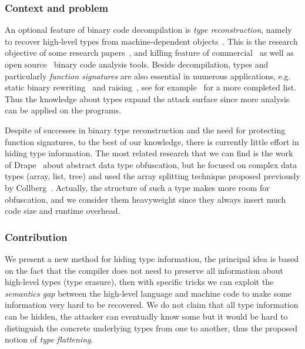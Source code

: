 \documentclass[compsoc,conference,a4paper,10pt,times]{IEEEtran}
\begin{document}
\subsubsection*{Context and problem}
An optional feature of binary code decompilation is \emph{type reconstruction}, namely to recover high-level types from machine-dependent
objects~\cite{mycroft_type-based_1999, van_emmerik_static_2007}. This is the research objective of some
research papers~\cite{lee_tie_2011,elwazeer_scalable_2013,robbins_minx_2016,noonan_polymorphic_2016},
and killing feature of commercial~\cite{noauthor_hex-rays_nodate,noauthor_jeb_nodate}
as well as open source~\cite{noauthor_ghidra_nodate} binary code analysis tools. Beside decompilation,
types and particularly \emph{function signatures} are also essential in numerous applications,
e.g. static binary rewriting~\cite{bernat_anywhere_2011,anand_compiler-level_2013} and
raising~\cite{yadavalli_raising_2019,goodman_lifting_2018},
see for example~\cite{caballero_type_2016} for a more completed list. Thus the knowledge about types
expand the attack surface since more analysis can be applied on the programs.

Despite of successes in binary type reconstruction and the need for protecting function signatures, to the best
of our knowledge, there is currently little effort in hiding type information. The most related research that we
can find is the work of Drape~\cite{drape_generalising_2007,drape_obfuscation_2004,drape_obfuscation_2006}
about abstract data type obfuscation, but he focused on complex data types (array, list, tree) and used
the array splitting technique proposed previously by Collberg~\cite{collberg_taxonomy_1997}.
Actually, the structure of such a
type makes more room for obfuscation, and we consider them heavyweight since they
always insert much code size and runtime overhead.

\subsubsection*{Contribution}
We present a new method for hiding type information, the principal idea is based on the fact that the compiler does not need to preserve all information
about high-level types (type erasure), then with specific tricks we can exploit the \emph{semantics gap} between
the high-level language and machine code to make some information very hard
to be recovered. We do not claim that all type information can be hidden, the attacker can
eventually know some but it would be hard to distinguish the concrete underlying types from one to another,
thus the proposed notion of \emph{type flattening}.
\end{document}
